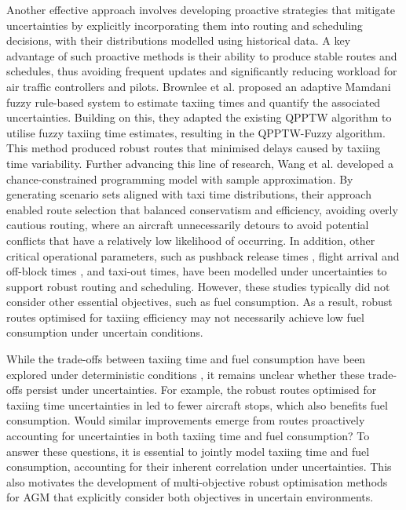 \documentclass{article}
\begin{document}
Another effective approach involves developing proactive strategies that mitigate uncertainties by explicitly incorporating them into routing and scheduling decisions, with their distributions modelled using historical data. A key advantage of such proactive methods is their ability to produce stable routes and schedules, thus avoiding frequent updates and significantly reducing workload for air traffic controllers and pilots. Brownlee et al. \cite{brownlee2018fuzzy} proposed an adaptive Mamdani fuzzy rule-based system to estimate taxiing times and quantify the associated uncertainties. Building on this, they adapted the existing QPPTW algorithm to utilise fuzzy taxiing time estimates, resulting in the QPPTW-Fuzzy algorithm. This method produced robust routes that minimised delays caused by taxiing time variability. Further advancing this line of research, Wang et al. \cite{wang2021chance} developed a chance-constrained programming model with sample approximation. By generating scenario sets aligned with taxi time distributions, their approach enabled route selection that balanced conservatism and efficiency, avoiding overly cautious routing, where an aircraft unnecessarily detours to avoid potential conflicts that have a relatively low likelihood of occurring. In addition, other critical operational parameters, such as pushback release times \cite{donmez2024airport}, flight arrival and off-block times \cite{yang2022stochastic}, and taxi-out times, have been modelled under uncertainties to support robust routing and scheduling. However, these studies typically did not consider other essential objectives, such as fuel consumption. As a result, robust routes optimised for taxiing efficiency may not necessarily achieve low fuel consumption under uncertain conditions. 

While the trade-offs between taxiing time and fuel consumption have been explored under deterministic conditions \cite{ravizza2013trade}, it remains unclear whether these trade-offs persist under uncertainties. For example, the robust routes optimised for taxiing time uncertainties in \cite{wang2021chance} led to fewer aircraft stops, which also benefits fuel consumption. Would similar improvements emerge from routes proactively accounting for uncertainties in both taxiing time and fuel consumption? To answer these questions, it is essential to jointly model taxiing time and fuel consumption, accounting for their inherent correlation under uncertainties. This also motivates the development of multi-objective robust optimisation methods for AGM that explicitly consider both objectives in uncertain environments.
\end{document}
